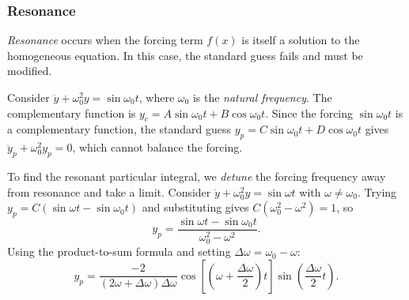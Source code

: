 \documentclass[a4paper]{article}
\begin{document}
\subsubsection{Resonance}
\begin{defi}[Resonance]
  \emph{Resonance} occurs when the forcing term $f(x)$ is itself a solution to the homogeneous equation. In this case, the standard guess fails and must be modified.
\end{defi}

\begin{eg}
  Consider $\ddot{y} + \omega_0^2 y = \sin \omega_0 t$, where $\omega_0$ is the \emph{natural frequency}. The complementary function is $y_c = A\sin \omega_0 t + B\cos \omega_0 t$. Since the forcing $\sin \omega_0 t$ is a complementary function, the standard guess $y_p = C\sin \omega_0 t + D\cos \omega_0 t$ gives $\ddot{y}_p + \omega_0^2 y_p = 0$, which cannot balance the forcing.
\end{eg}

\begin{remark}
  To find the resonant particular integral, we \emph{detune} the forcing frequency away from resonance and take a limit. Consider $\ddot{y} + \omega_0^2 y = \sin \omega t$ with $\omega \neq \omega_0$. Trying $y_p = C(\sin \omega t - \sin \omega_0 t)$ and substituting gives $C(\omega_0^2 - \omega^2) = 1$, so
  \[
    y_p = \frac{\sin \omega t - \sin \omega_0 t}{\omega_0^2 - \omega^2}.
  \]
  Using the product-to-sum formula and setting $\Delta\omega = \omega_0 - \omega$:
  \[
    y_p = \frac{-2}{(2\omega + \Delta \omega)\Delta \omega}\cos \left[\left(\omega + \frac{\Delta \omega}{2}\right)t\right] \sin \left(\frac{\Delta \omega}{2}t\right).
  \]
\end{remark}
\end{document}
